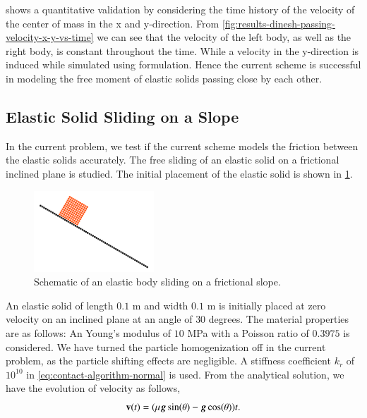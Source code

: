  shows a quantitative
validation by considering the time history of the velocity of the center of
mass in the x and y-direction. From
\cref{fig:results-dinesh-passing-velocity-x-y-vs-time} we can see that the
velocity of the left body, as well as the right body, is constant throughout
the time. While a velocity in the y-direction is induced while simulated using
\textcite{adepu2021corrected} formulation. Hence the current scheme is successful
in modeling the free moment of elastic solids passing close by each other.

\FloatBarrier%
\subsection{Elastic Solid Sliding on a Slope}
\label{sec:results-elastic-solid-sliding-on-slope}
In the current problem, we test if the current scheme models the friction
between the elastic solids accurately. The free sliding of an elastic solid on
a frictional inclined plane is studied. The initial placement of the elastic
solid is shown in \cref{fig:results-solid-sliding-schematic}.
\begin{figure}[!htpb]
  \centering
  \includegraphics[width=0.4\textwidth]{figures/csph/figures/mohseni_2021_free_sliding_on_a_slope/fric_coeff_0_4/pre_schematic}
  \caption{Schematic of an elastic body sliding on a frictional slope.}
\label{fig:results-solid-sliding-schematic}
\end{figure}

An elastic solid of length $0.1$ m and width $0.1$ m is initially placed at zero
velocity on an inclined plane at an angle of $30$ degrees. The material
properties are as follows: An Young's modulus of $10$ MPa with a Poisson ratio
of $0.3975$ is considered. We have turned the particle homogenization off in the
current problem, as the particle shifting effects are negligible. A stiffness
coefficient $k_r$ of $10^{10}$ in \cref{eq:contact-algorithm-normal} is used.
From the analytical solution, we have the evolution of velocity as follows,
\begin{equation}
  \label{eq:analytical-sliding-body}
  \mathbf{v}(t) = (\mu \boldsymbol{g} \sin (\theta) - \boldsymbol{g} \cos (\theta)) t.
\end{equation}

